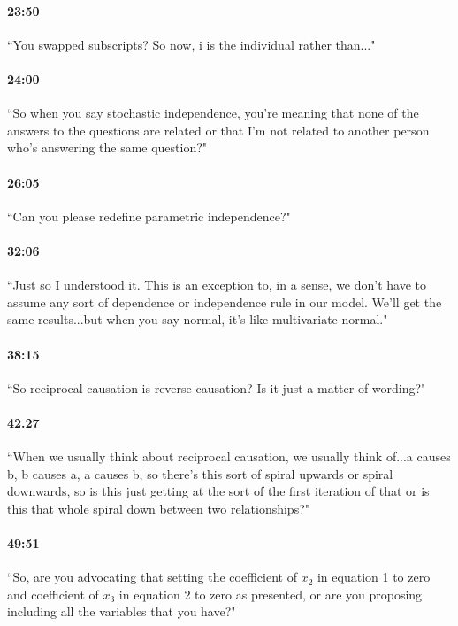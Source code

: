 \documentclass[11pt]{article}
\begin{document}
\paragraph{23:50} ``You swapped subscripts? So now, i is the individual rather than..."

\paragraph{24:00} ``So when you say stochastic independence, you're meaning that none of the answers to the questions are related or that I'm not related to another person who's answering the same question?"

\paragraph{26:05} ``Can you please redefine parametric independence?"

\paragraph{32:06} ``Just so I understood it. This is an exception to, in a sense, we don't have to assume any sort of dependence or independence rule in our model. We'll get the same results...but when you say normal, it's like multivariate normal."

\paragraph{38:15} ``So reciprocal causation is reverse causation? Is it just a matter of wording?"

\paragraph{42.27} ``When we usually think about reciprocal causation, we usually think of...a causes b, b causes a, a causes b, so there's this sort of spiral upwards or spiral downwards, so is this just getting at the sort of the first iteration of that or is this that whole spiral down between two relationships?"

\paragraph{49:51} ``So, are you advocating that setting the coefficient of $x_2$ in equation 1 to zero and coefficient of $x_3$ in equation 2 to zero as presented, or are you proposing including all the variables that you have?"
\end{document}
